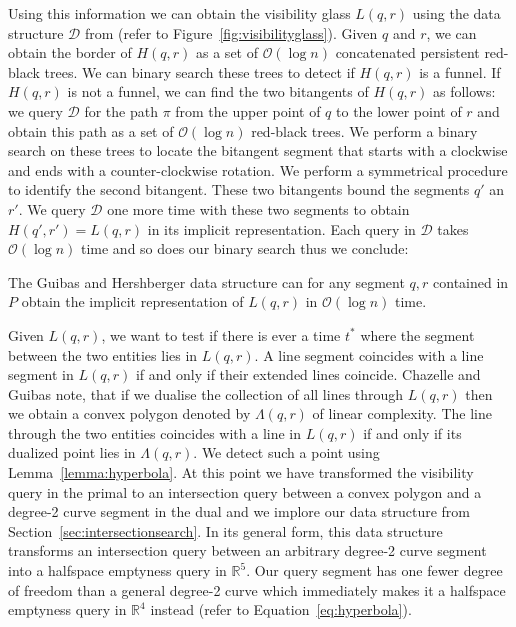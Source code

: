 \documentclass[a4paper, UKenglish]{lipics-v2018}
\begin{document}
Using this information we can obtain the visibility glass $L(q,r)$ using the data structure $\mathcal{D}$ from \cite{guibas1989optimal} (refer to Figure~\ref{fig:visibilityglass}). Given $q$ and $r$, we can obtain the border of $H(q,r)$ as a set of $\mathcal{O}(\log n)$ concatenated persistent red-black trees. We can binary search these trees to detect if $H(q,r)$ is a funnel. If $H(q,r)$ is not a funnel, we can find the two bitangents of $H(q,r)$ as follows: we query $\mathcal{D}$ for the path $\pi$ from the upper point of $q$ to the lower point of $r$ and obtain this path as a set of $\mathcal{O}(\log n)$ red-black trees. We perform a binary search on these trees to locate the bitangent segment that starts with a clockwise and ends with a counter-clockwise rotation. We perform a symmetrical procedure to identify the second bitangent.
These two bitangents bound the segments $q'$ an $r'$. We query $\mathcal{D}$ one more time with these two segments to obtain $H(q', r') = L(q,r)$ in its implicit representation. Each query in $\mathcal{D}$ takes $\mathcal{O}(\log n)$ time and so does our binary search thus we conclude:

\begin{lemma}
\label{lemma:visibilityquery}
  The Guibas and Hershberger data structure can for any segment $q,r$ contained in $P$ obtain the implicit representation of $L(q,r)$ in $\mathcal{O}(\log n)$ time.
\end{lemma}

 
Given $L(q,r)$, we want to test if there is ever a time $t^*$ where the segment between the two entities lies in $L(q,r)$. A line segment coincides with a line segment in $L(q,r)$ if and only if their extended lines coincide. Chazelle and Guibas \cite{Chazelle1989} note, that if we dualise the collection of all lines through $L(q,r)$ then we obtain a convex polygon denoted by $\Lambda(q,r)$ of linear complexity. The line through the two entities coincides with a line in $L(q,r)$ if and only if its dualized point lies in $\Lambda(q,r)$. We detect such a point using Lemma~\ref{lemma:hyperbola}. 
At this point we have transformed the visibility query in the primal to an intersection query between a convex polygon and a degree-2 curve segment in the dual and we implore our data structure from Section~\ref{sec:intersectionsearch}. In its general form, this data structure transforms an intersection query between an arbitrary degree-2 curve segment into a halfspace emptyness query in $\mathbb{R}^5$. Our query segment has one fewer degree of freedom than a general degree-2 curve which immediately makes it a halfspace emptyness query in $\mathbb{R}^4$ instead (refer to Equation~\ref{eq:hyperbola}).
\end{document}

